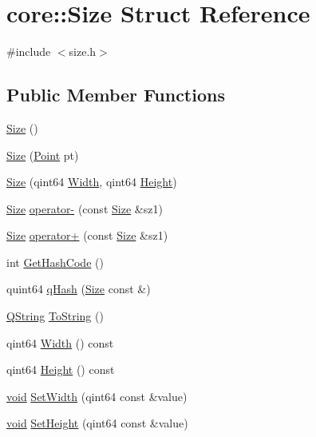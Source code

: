 \hypertarget{structcore_1_1_size}{\section{core\-:\-:\-Size \-Struct \-Reference}
\label{structcore_1_1_size}
}


{\ttfamily \#include $<$size.\-h$>$}

\subsection*{\-Public \-Member \-Functions}
\begin{DoxyCompactItemize}
\item 
\hyperlink{group___o_p_map_widget_gaf57b3247af9a9399f85615e6ad8a6981}{\-Size} ()
\item 
\hyperlink{group___o_p_map_widget_ga03e339782ac393b92ad72e1d850589f6}{\-Size} (\hyperlink{structcore_1_1_point}{\-Point} pt)
\item 
\hyperlink{group___o_p_map_widget_gab8baf4ac21066099566fc15ba5f9542d}{\-Size} (qint64 \hyperlink{group___o_p_map_widget_ga57df26ac2174659d7a906e8d31a34080}{\-Width}, qint64 \hyperlink{group___o_p_map_widget_ga9c12f3b98a93a81fab566f35d93c7d20}{\-Height})
\item 
\hyperlink{structcore_1_1_size}{\-Size} \hyperlink{group___o_p_map_widget_ga5d0fdc38eda28a8c6bb71c421cb18150}{operator-\/} (const \hyperlink{structcore_1_1_size}{\-Size} \&sz1)
\item 
\hyperlink{structcore_1_1_size}{\-Size} \hyperlink{group___o_p_map_widget_gacede8c8f61fa4e8ab03f0780af61b66b}{operator+} (const \hyperlink{structcore_1_1_size}{\-Size} \&sz1)
\item 
int \hyperlink{group___o_p_map_widget_ga8e9b3c1ccd7f2e2d5a6f9c4767c06043}{\-Get\-Hash\-Code} ()
\item 
quint64 \hyperlink{group___o_p_map_widget_ga1f7482f21c86bc1b02f1e6d8ab2de12c}{q\-Hash} (\hyperlink{structcore_1_1_size}{\-Size} const \&)
\item 
\hyperlink{group___u_a_v_objects_plugin_gab9d252f49c333c94a72f97ce3105a32d}{\-Q\-String} \hyperlink{group___o_p_map_widget_ga69bf932485cc775bf1cd98d26961ebab}{\-To\-String} ()
\item 
qint64 \hyperlink{group___o_p_map_widget_ga57df26ac2174659d7a906e8d31a34080}{\-Width} () const 
\item 
qint64 \hyperlink{group___o_p_map_widget_ga9c12f3b98a93a81fab566f35d93c7d20}{\-Height} () const 
\item 
\hyperlink{group___u_a_v_objects_plugin_ga444cf2ff3f0ecbe028adce838d373f5c}{void} \hyperlink{group___o_p_map_widget_gae28441c62e671e06cff1065e13176f33}{\-Set\-Width} (qint64 const \&value)
\item 
\hyperlink{group___u_a_v_objects_plugin_ga444cf2ff3f0ecbe028adce838d373f5c}{void} \hyperlink{group___o_p_map_widget_gaeb60d897c19a5a111737e862c17dadbd}{\-Set\-Height} (qint64 const \&value)
\end{DoxyCompactItemize}
